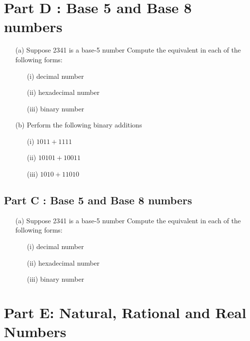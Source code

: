 \documentclass[]{report}
\begin{document}
	
	\newpage
	
	
	
	
	
\section*{Part D : Base 5 and Base 8 numbers}
\begin{itemize}
	\item[(a)] Suppose 2341 is a base-5 number
	Compute the equivalent in each of the following forms:
	\begin{itemize}
		\item[(i)] decimal number
		\item[(ii)] hexadecimal number
		\item[(iii)] binary number
	\end{itemize}
	\item[(b)] Perform the following binary additions
	\begin{itemize}
		\item[(i)] $1011+ 1111$
		\item[(ii)] $10101  + 10011$
		\item[(iii)] $1010 + 11010$
	\end{itemize}
\end{itemize}

	\subsection*{Part C : Base 5 and Base 8 numbers}
	\begin{itemize}
		\item[(a)] Suppose 2341 is a base-5 number
		Compute the equivalent in each of the following forms:
		\begin{itemize}
			\item[(i)] decimal number
			\item[(ii)] hexadecimal number
			\item[(iii)] binary number
		\end{itemize}
		
	\end{itemize}
	\section*{Part E: Natural, Rational and Real Numbers}
	\begin{framed}
		\end{framed}
	
\end{document}
